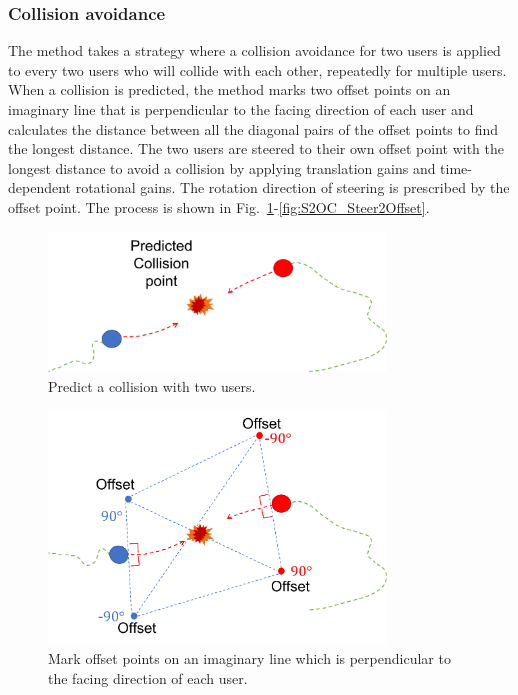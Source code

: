 \subsubsection{Collision avoidance}
The method takes a strategy where a collision avoidance for two users is applied to every two users who will collide with each other, repeatedly for multiple users. When a collision is predicted, the method marks two offset points on an imaginary line that is perpendicular to the facing direction of each user and calculates the distance between all the diagonal pairs of the offset points to find the longest distance. The two users are steered to their own offset point with the longest distance to avoid a collision by applying translation gains and time-dependent rotational gains. The rotation direction of steering is prescribed by the offset point. The process is shown in Fig.~\ref{fig:S2OC_detect}-\ref{fig:S2OC_Steer2Offset}.
\begin{figure}[H]\centering
	\includegraphics[width=0.8\textwidth]{Pictures/Predict the collision with the other user.png}%
	\caption{Predict a collision with two users.}\label{fig:S2OC_detect}%
\end{figure}
\begin{figure}[H]\centering
	\includegraphics[width=0.8\textwidth]{Pictures/Mark offset points on the imaginary line which is perpendicular to the facing direction of each user.png}%
	\caption{Mark offset points on an imaginary line which is perpendicular to the facing direction of each user.}\label{fig:S2OC_mark}%
\end{figure}

